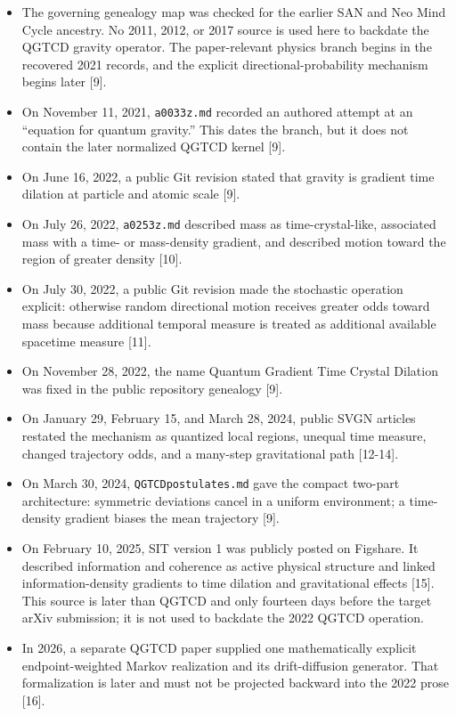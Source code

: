 \documentclass[
  american,
  11pt,
  letterpaper,
]{article}
\providecommand{\tightlist}{%
  \setlength{\itemsep}{0pt}\setlength{\parskip}{0pt}}
\begin{document}
\begin{itemize}
\tightlist
\item
  The governing genealogy map was checked for the earlier SAN and Neo Mind Cycle ancestry. No 2011, 2012, or 2017 source is used here to backdate the QGTCD gravity operator. The paper-relevant physics branch begins in the recovered 2021 records, and the explicit directional-probability mechanism begins later {[}9{]}.
\item
  On November 11, 2021, \texttt{a0033z.md} recorded an authored attempt at an ``equation for quantum gravity.'' This dates the branch, but it does not contain the later normalized QGTCD kernel {[}9{]}.
\item
  On June 16, 2022, a public Git revision stated that gravity is gradient time dilation at particle and atomic scale {[}9{]}.
\item
  On July 26, 2022, \texttt{a0253z.md} described mass as time-crystal-like, associated mass with a time- or mass-density gradient, and described motion toward the region of greater density {[}10{]}.
\item
  On July 30, 2022, a public Git revision made the stochastic operation explicit: otherwise random directional motion receives greater odds toward mass because additional temporal measure is treated as additional available spacetime measure {[}11{]}.
\item
  On November 28, 2022, the name Quantum Gradient Time Crystal Dilation was fixed in the public repository genealogy {[}9{]}.
\item
  On January 29, February 15, and March 28, 2024, public SVGN articles restated the mechanism as quantized local regions, unequal time measure, changed trajectory odds, and a many-step gravitational path {[}12-14{]}.
\item
  On March 30, 2024, \nolinkurl{QGTCDpostulates.md} gave the compact two-part architecture: symmetric deviations cancel in a uniform environment; a time-density gradient biases the mean trajectory {[}9{]}.
\item
  On February 10, 2025, SIT version 1 was publicly posted on Figshare. It described information and coherence as active physical structure and linked information-density gradients to time dilation and gravitational effects {[}15{]}. This source is later than QGTCD and only fourteen days before the target arXiv submission; it is not used to backdate the 2022 QGTCD operation.
\item
  In 2026, a separate QGTCD paper supplied one mathematically explicit endpoint-weighted Markov realization and its drift-diffusion generator. That formalization is later and must not be projected backward into the 2022 prose {[}16{]}.
\end{itemize}
\end{document}
